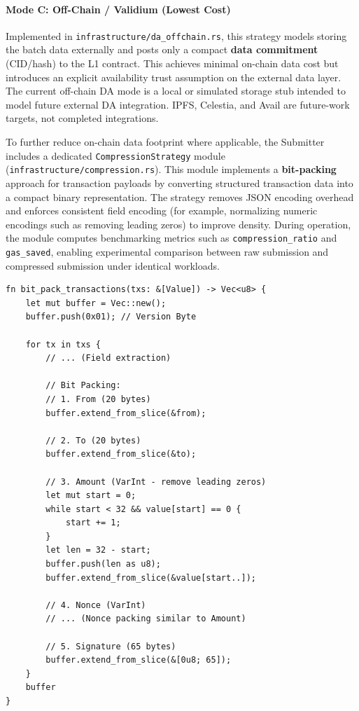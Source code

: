 \paragraph{Mode C: Off-Chain / Validium (Lowest Cost)}
Implemented in \texttt{infrastructure/da\_offchain.rs}, this strategy models storing the batch data externally and posts only a compact \textbf{data commitment} (CID/hash) to the L1 contract. This achieves minimal on-chain data cost but introduces an explicit availability trust assumption on the external data layer. The current off-chain DA mode is a local or simulated storage stub intended to model future external DA integration. IPFS, Celestia, and Avail are future-work targets, not completed integrations.


To further reduce on-chain data footprint where applicable, the Submitter includes a dedicated \texttt{CompressionStrategy} module (\texttt{infrastructure/compression.rs}). This module implements a \textbf{bit-packing} approach for transaction payloads by converting structured transaction data into a compact binary representation. The strategy removes JSON encoding overhead and enforces consistent field encoding (for example, normalizing numeric encodings such as removing leading zeros) to improve density. During operation, the module computes benchmarking metrics such as \texttt{compression\_ratio} and \texttt{gas\_saved}, enabling experimental comparison between raw submission and compressed submission under identical workloads.

\begin{lstlisting}[style=rustStyle, caption={Bit-Packing Compression Logic}, label={lst:compression-logic}]
fn bit_pack_transactions(txs: &[Value]) -> Vec<u8> {
    let mut buffer = Vec::new();
    buffer.push(0x01); // Version Byte

    for tx in txs {
        // ... (Field extraction)

        // Bit Packing:
        // 1. From (20 bytes)
        buffer.extend_from_slice(&from);

        // 2. To (20 bytes)
        buffer.extend_from_slice(&to);

        // 3. Amount (VarInt - remove leading zeros)
        let mut start = 0;
        while start < 32 && value[start] == 0 {
            start += 1;
        }
        let len = 32 - start;
        buffer.push(len as u8);
        buffer.extend_from_slice(&value[start..]);

        // 4. Nonce (VarInt)
        // ... (Nonce packing similar to Amount)

        // 5. Signature (65 bytes)
        buffer.extend_from_slice(&[0u8; 65]);
    }
    buffer
}
\end{lstlisting}


